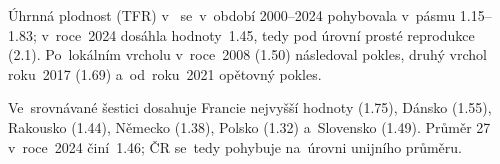 Úhrnná plodnost (\ac{TFR}) v~ se~v~období 2000--2024 pohybovala v~pásmu \numrange{1,15}{1,83}; v~roce~2024 dosáhla hodnoty~\num{1,45}, tedy pod úrovní prosté reprodukce (\num{2,1}). Po~lokálním vrcholu v~roce~2008 (\num{1,50}) následoval pokles, druhý vrchol roku~2017 (\num{1,69}) a~od~roku~2021 opětovný pokles.

Ve~srovnávané šestici dosahuje Francie nejvyšší hodnoty (\num{1,75}), Dánsko (\num{1,55}), Rakousko (\num{1,44}), Německo (\num{1,38}), Polsko (\num{1,32}) a~Slovensko (\num{1,49}). Průměr 27 v~roce~2024 činí~\num{1,46}; \ac{ČR} se~tedy pohybuje na~úrovni unijního průměru.

